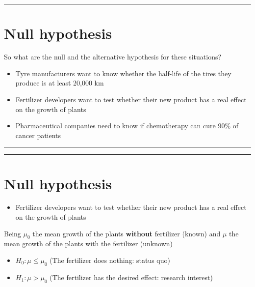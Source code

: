 \documentclass[
]{book}
\providecommand{\tightlist}{%
  \setlength{\itemsep}{0pt}\setlength{\parskip}{0pt}}
\begin{document}
\begin{center}\rule{0.5\linewidth}{0.5pt}\end{center}

\hypertarget{null-hypothesis}{%
\section{Null hypothesis}\label{null-hypothesis}}

So what are the null and the alternative hypothesis for these situations?

\begin{itemize}
\item
  Tyre manufacturers want to know whether the half-life of the tires they produce is at least 20,000 km
\item
  Fertilizer developers want to test whether their new product has a real effect on the growth of plants
\item
  Pharmaceutical companies need to know if chemotherapy can cure 90\% of cancer patients
\end{itemize}

\begin{center}\rule{0.5\linewidth}{0.5pt}\end{center}

\begin{center}\rule{0.5\linewidth}{0.5pt}\end{center}

\hypertarget{null-hypothesis-1}{%
\section{Null hypothesis}\label{null-hypothesis-1}}

\begin{itemize}
\tightlist
\item
  Fertilizer developers want to test whether their new product has a real effect on the growth of plants
\end{itemize}

Being \(\mu_0\) the mean growth of the plants \textbf{without} fertilizer (known) and \(\mu\) the mean growth of the plants with the fertilizer (unknown)

\begin{itemize}
\tightlist
\item
  \(H_0:\mu \leq \mu_0\) (The fertilizer does nothing: status quo)
\item
  \(H_1:\mu > \mu_0\) (The fertilizer has the desired effect: research interest)
\end{itemize}
\end{document}
